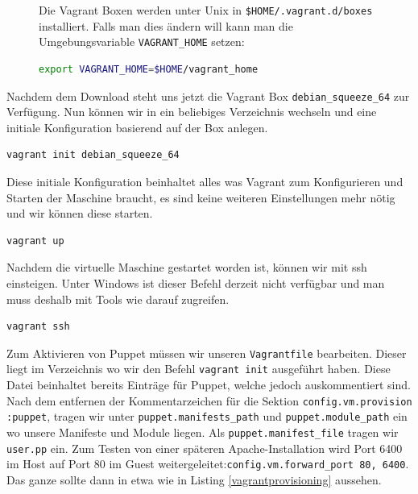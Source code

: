 \documentclass[12pt,a4paper,ngerman]{article}
\begin{document}
\begin{figure}
\vspace{-20pt}
\begin{boxedminipage}{4.5cm}
 Die Vagrant Boxen werden unter Unix in \lstinline!$HOME/.vagrant.d/boxes! installiert. 
Falls man dies ändern will kann man die Umgebungsvariable \lstinline$VAGRANT_HOME$ setzen:
\begin{lstlisting}[language=sh,label=vagrant-home,frame=none,numbers=none]
export VAGRANT_HOME=$HOME/vagrant_home
\end{lstlisting}
\end{boxedminipage}
\vspace{-20pt}
\end{figure}
 

Nachdem dem Download steht uns jetzt die  Vagrant Box \lstinline$debian_squeeze_64$ zur Verfügung. Nun können wir in ein beliebiges Verzeichnis wechseln und eine initiale Konfiguration basierend auf der Box anlegen.

\begin{lstlisting}[language=sh,caption=Vagrant initialisieren, label=vagrant-init]
vagrant init debian_squeeze_64
\end{lstlisting}

Diese initiale Konfiguration beinhaltet alles was Vagrant zum Konfigurieren und Starten der Maschine braucht, es sind keine weiteren Einstellungen mehr nötig und wir können diese starten.

\begin{lstlisting}[language=sh,caption=Starten der Vagrant Maschine, label=vagrant-up]
vagrant up
\end{lstlisting}

Nachdem die virtuelle Maschine gestartet worden ist, können wir mit ssh einsteigen. Unter Windows ist dieser Befehl derzeit nicht verfügbar und man muss deshalb mit Tools wie \cite{putty} darauf zugreifen.
\begin{lstlisting}[language=sh,caption=Mit ssh in der Vagrant Maschine einsteigen, label=vagrant-ssh]
vagrant ssh
\end{lstlisting}
 
Zum Aktivieren von Puppet müssen wir unseren \lstinline$Vagrantfile$ bearbeiten. Dieser liegt im Verzeichnis wo wir den Befehl \lstinline$vagrant init$ ausgeführt haben. Diese Datei beinhaltet bereits Einträge für Puppet, welche jedoch auskommentiert sind. Nach dem entfernen der Kommentarzeichen für die Sektion \lstinline$config.vm.provision :puppet$, tragen wir unter \lstinline$puppet.manifests_path$ und \lstinline$puppet.module_path$ ein wo unsere Manifeste und Module liegen. Als \lstinline$puppet.manifest_file$ tragen wir \lstinline$user.pp$ ein. Zum Testen von einer späteren Apache-Installation wird Port 6400 im Host auf Port 80 im Guest weitergeleitet:\lstinline$config.vm.forward_port 80, 6400$. Das ganze sollte dann in etwa wie in Listing \ref{vagrantprovisioning} aussehen.
  
\end{document}
